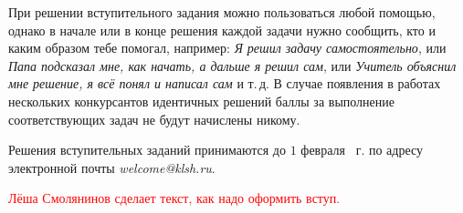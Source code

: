 При решении вступительного задания можно пользоваться любой помощью, однако в начале или в конце решения каждой задачи нужно сообщить, кто и каким образом тебе помогал, например: \textit{Я решил задачу самостоятельно}, или \textit{Папа подсказал мне, как начать, а дальше я решил сам}, или \textit{Учитель объяснил мне решение, я всё понял и написал сам} и т.\,д. В случае появления в работах нескольких конкурсантов идентичных решений баллы за выполнение соответствующих задач не будут начислены никому.

Решения вступительных заданий принимаются до $1$ февраля \theyear{}~г. по адресу электронной почты \textit{welcome@klsh.ru}.

\textcolor{red}{Лёша Смолянинов сделает текст, как надо оформить вступ.}
%
%
 
